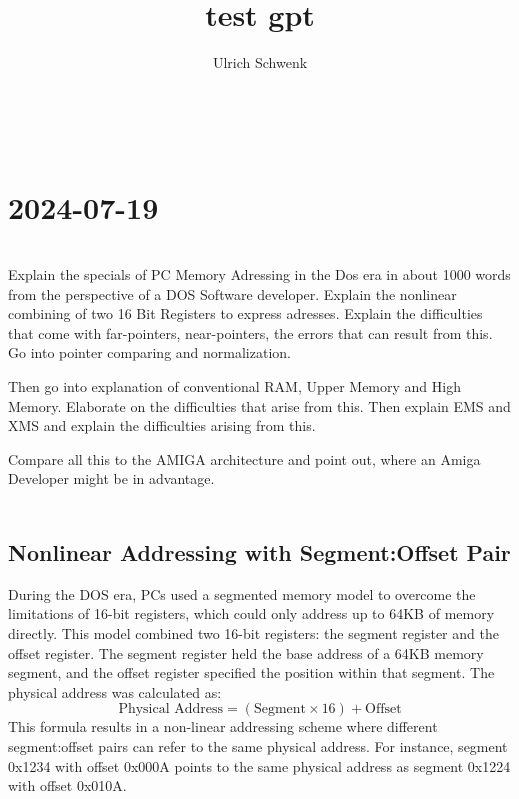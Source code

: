 \documentclass[a4paper]{article}
\author{Ulrich Schwenk}
\title{test gpt}
\begin{document}
\setlength{\tabulinesep}{6pt}
\maketitle
\newpage

\begin{dialogue}
 \leavevmode\\
\end{dialogue}




\section*{2024-07-19}
\begin{dialogue}
 \leavevmode\\
Explain the specials of PC Memory Adressing in the Dos era in about 1000 words from the perspective of a DOS Software developer. Explain the nonlinear combining of two 16 Bit Registers to express adresses. Explain the difficulties that come with far-pointers, near-pointers, the errors that can result from this. Go into pointer comparing and normalization.

Then go into explanation of conventional RAM, Upper Memory and High Memory. Elaborate on the difficulties that arise from this. Then explain EMS and XMS and explain the difficulties arising from this.

Compare all this to the AMIGA architecture and point out, where an Amiga Developer might be in advantage.
 \leavevmode\\
 \leavevmode\\
\end{dialogue}
\subsection*{Nonlinear Addressing with Segment:Offset Pair}
During the DOS era, PCs used a segmented memory model to overcome the limitations of 16-bit registers, which could only address up to 64KB of memory directly. This model combined two 16-bit registers: the segment register and the offset register. The segment register held the base address of a 64KB memory segment, and the offset register specified the position within that segment. The physical address was calculated as:
\[
\text{Physical Address} = (\text{Segment} \times 16) + \text{Offset}
\]
This formula results in a non-linear addressing scheme where different segment:offset pairs can refer to the same physical address. For instance, segment 0x1234 with offset 0x000A points to the same physical address as segment 0x1224 with offset 0x010A.
\end{document}
